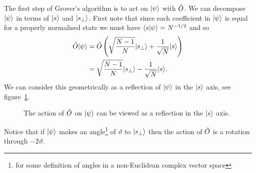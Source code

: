     The first step of Grover's algorithm is to act on \(\vert {\psi} \rangle\) with \(\hat{O}\).
    We can decompose \(\vert {\psi} \rangle\) in terms of \(\vert {s} \rangle\) and \(\vert {s_\perp} \rangle\).
    First note that since each coefficient in \(\vert {\psi} \rangle\) is equal for a properly normalised state we must have \(\langle {s} \vert {\psi} \rangle = N^{-1/2}\) and so
    \begin{align*}
        \hat{O}\vert {\psi} \rangle &= \hat{O}\left(\sqrt{\frac{N-1}{N}}\vert {s_\perp} \rangle + \frac{1}{\sqrt{N}}\vert {s} \rangle\right)\\
        &= \sqrt{\frac{N - 1}{N}}\vert {s_\perp} \rangle - \frac{1}{\sqrt{N}}\vert {s} \rangle.
    \end{align*}
    We can consider this geometrically as a reflection of \(\vert {\psi} \rangle\) in the \(\vert {s} \rangle\) axis, see figure~\ref{fig:action of O in grover algorithm as a reflection}.
    \begin{figure}[ht]
        \centering
        \caption{The action of \(\hat{O}\) on \(\vert {\psi} \rangle\) can be viewed as a reflection in the \(\vert {s} \rangle\) axis.}
        \label{fig:action of O in grover algorithm as a reflection}
    \end{figure}
    Notice that if \(\vert {\psi} \rangle\) makes an angle\footnote{for some definition of angles in a non-Euclidean complex vector space} of \(\vartheta\) to \(\vert {s_{\perp}} \rangle\) then the action of \(\hat{O}\) is a rotation through \(-2\vartheta\).
    
